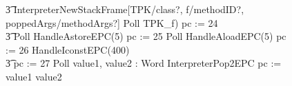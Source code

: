 \begin{figure}[tp!]
{\begin{circus}
    \t3 \lschexpract InterpreterNewStackFrame[TPK/class?, f/methodID?, poppedArgs/methodArgs?] \rschexpract \circseq Poll \circseq TPK\_f) \circseq pc := 24 \circseq \\
    \t3 Poll \circseq HandleAstoreEPC(5) \circseq pc := 25 \circseq Poll \circseq HandleAloadEPC(5) \circseq pc := 26 \circseq HandleIconstEPC(400) \circseq \\
    \t3 pc := 27 \circseq Poll \circseq \circvar value1, value2 : Word \circspot InterpreterPop2EPC \circseq pc := \IF value1 \leq value2   \\

\end{circus}}
\end{figure}

